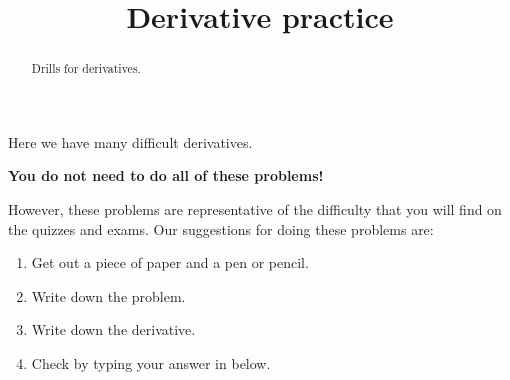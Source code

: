 \documentclass{ximera}
\title[Reinforce:]{Derivative practice}
\begin{document}
\begin{abstract}
  Drills for derivatives.
\end{abstract}
\maketitle

Here we have many difficult derivatives.
\begin{center}
  \textbf{You do not need to do all of
    these problems!}
\end{center}

However, these problems are representative of the difficulty that you
will find on the quizzes and exams. Our suggestions for doing these
problems are:
\begin{enumerate}
\item Get out a piece of paper and a pen or pencil.
\item Write down the problem.
\item Write down the derivative.
\item Check by typing your answer in below.
\end{enumerate}
\end{document}

